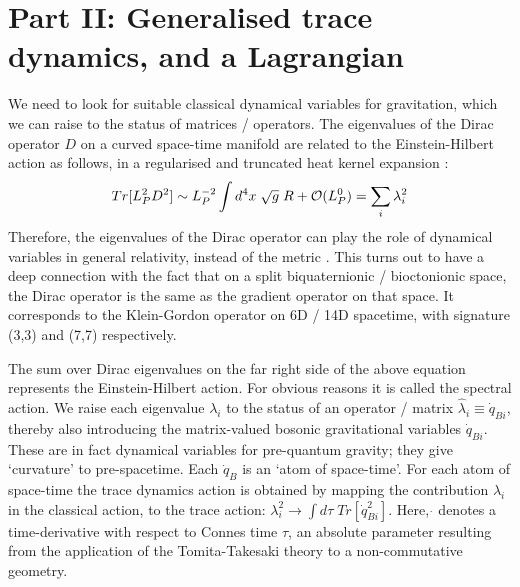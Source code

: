 \documentclass{iopconfser}
\begin{document}
\section{Part II:  Generalised trace dynamics, and a Lagrangian}
We need to look for suitable classical dynamical variables for gravitation, which we can raise to the status of matrices / operators. The eigenvalues of the Dirac operator $D$ on a curved space-time manifold are related to the Einstein-Hilbert action as follows, in a regularised and truncated heat kernel expansion \cite{CC}:
\begin{equation}
Tr [L_P^2 D^2] \sim L_P^{-2}\int d^4x\; \sqrt{g}\; R + {\cal O}(L_P^{0}) =\sum_{i}\lambda_i^2 
\end{equation}
Therefore, the eigenvalues of the Dirac operator can play the role of dynamical variables in general relativity, instead of the metric \cite{Landi}. This turns out to have a deep connection with the fact that on a split biquaternionic / bioctonionic space, the Dirac operator is the same as the gradient operator on that space. It corresponds to the Klein-Gordon operator on 6D / 14D spacetime, with signature (3,3) and (7,7) respectively.

The sum over Dirac eigenvalues on the far right side of the above equation represents the Einstein-Hilbert action. For obvious reasons it is called the spectral action. We raise each eigenvalue $\lambda_i$ to the status of an operator / matrix $\hat{\lambda}_i\equiv \dot{q}_{Bi}$, thereby also introducing the matrix-valued bosonic gravitational variables $\dot{q}_{Bi}$. These are in fact dynamical variables for pre-quantum gravity; they give `curvature' to pre-spacetime. Each $\dot{q}_B$ is an `atom of space-time'. For each atom of space-time the trace dynamics action is obtained by mapping the contribution $\lambda_i$ in the classical action, to the trace action: $\lambda_i^2 \rightarrow \int d\tau\; Tr [\dot{q}_{Bi}^2]$. Here, $\dot{}$ denotes a time-derivative with respect to Connes time $\tau$, an absolute parameter resulting from the application of the 
Tomita-Takesaki theory to a non-commutative geometry.
\end{document}
